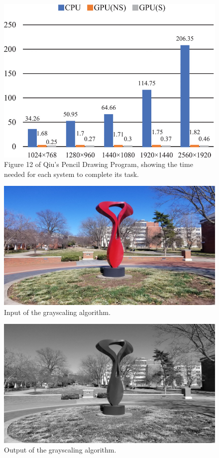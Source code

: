 \documentclass[conference]{IEEEtran}
\begin{document}
\begin{figure}[h!]
    \includegraphics[width=\linewidth]{output.jpg}
    \caption{Figure 12 of Qiu's Pencil Drawing Program, showing the time needed for each system to complete its task.\cite{Liu}}
    \label{fig:Performance of Original Pencil Drawing Program}
\end{figure}
\begin{figure}[h!]
    \includegraphics[width=\linewidth]{Image.jpg}
    \caption{Input of the grayscaling algorithm.}
    \label{fig:Performance of Original Pencil Drawing Program}
\end{figure}
\begin{figure}[h!]
    \includegraphics[width=\linewidth]{GrayScaleImage.jpg}
    \caption{Output of the grayscaling algorithm.}
    \label{fig:Performance of Original Pencil Drawing Program}
\end{figure}
\end{document}
